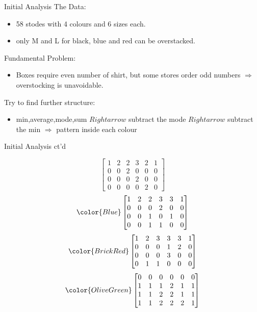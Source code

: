 \begin{frame}{Initial Analysis}
	The Data:
	\begin{itemize}
		\item 58 stodes with 4 colours and 6 sizes each.
		\item only M and L for black, blue and red can be overstacked.
	\end{itemize}
	Fundamental Problem:
	\begin{itemize}
		\item Boxes require even number of shirt, but some stores order odd numbers $\Rightarrow$ overstocking is unavoidable.
	\end{itemize}
	Try to find further structure:
	\begin{itemize}
		\item min,average,mode,sum $Rightarrow$ subtract the mode $Rightarrow$ subtract the min $\Rightarrow$ pattern inside each colour
	\end{itemize}
\end{frame}
\begin{frame}{Initial Analysis ct'd}

\begin{equation}
     \begin{bmatrix}
     1&2&2&3&2&1\\
  0&0&2&0&0&0\\
  0&0&0&2&0&0\\
  0&0&0&0&2&0
     \end{bmatrix}
\end{equation}
\begin{equation}
\color{Blue}
    \begin{bmatrix}
        1&2&2&3&3&1\\
        0&0&0&2&0&0\\
        0&0&1&0&1&0\\
        0&0&1&1&0&0\\
    \end{bmatrix}
\end{equation}
\begin{equation}
\color{BrickRed}
    \begin{bmatrix}
         1&2&3&3&3&1\\
         0&0&0&1&2&0\\
         0&0&0&3&0&0\\
         0&1&1&0&0&0\\
    \end{bmatrix}
\end{equation}
\begin{equation}
\color{OliveGreen}
    \begin{bmatrix}
         0&0&0&0&0&0\\
         1&1&1&2&1&1\\
         1&1&2&2&1&1\\
         1&1&2&2&2&1\\
        
    \end{bmatrix}
\end{equation}
\end{frame}
